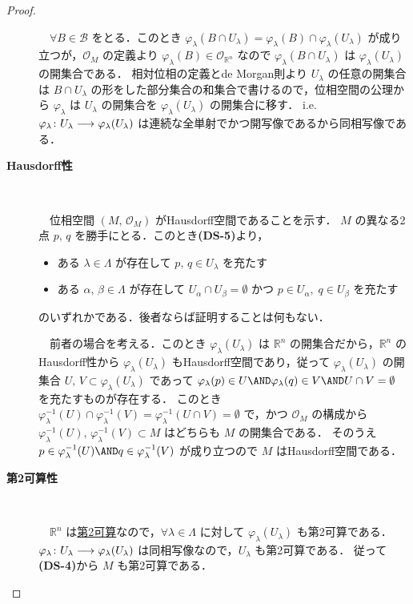 \documentclass[TQFT_main]{subfiles}
\begin{document}
\begin{proof}
\begin{description}
		　$\forall B \in \mathscr{B}$ をとる．このとき $\varphi_\lambda(B \cap U_\lambda) = \varphi_\lambda(B) \cap \varphi_\lambda(U_\lambda)$ が成り立つが，$\mathscr{O}_M$ の定義より $\varphi_\lambda(B) \in \mathscr{O}_{\mathbb{R}^n}$ なので $\varphi_\lambda(B \cap U_\lambda)$ は $\varphi_\lambda(U_\lambda)$ の開集合である．
		相対位相の定義とde Morgan則より $U_\lambda$ の任意の開集合は $B \cap U_\lambda$ の形をした部分集合の和集合で書けるので，位相空間の公理から $\varphi_\lambda$ は $U_\lambda$ の開集合を $\varphi_\lambda(U_\lambda)$ の開集合に移す．
		i.e. $\varphi_\lambda \colon U_\lambda \longrightarrow \varphi_\lambda(U_\lambda)$ は連続な全単射でかつ開写像であるから同相写像である．

		\item[\textbf{Hausdorff性}]　
		
		　位相空間 $(M,\, \mathscr{O}_M)$ がHausdorff空間であることを示す．
		$M$ の異なる2点 $p,\, q$ を勝手にとる．このとき\textsf{\textbf{(DS-5)}}より，
		\begin{itemize}
			\item ある $\lambda \in \Lambda$ が存在して $p,\, q \in U_\lambda$ を充たす
			\item ある $\alpha,\, \beta \in \Lambda$ が存在して $U_\alpha \cap U_\beta = \emptyset$ かつ $p \in U_\alpha,\; q \in U_\beta$ を充たす
		\end{itemize}
		のいずれかである．後者ならば証明することは何もない．

		　前者の場合を考える．このとき $\varphi_\lambda(U_\lambda)$ は $\mathbb{R}^n$ の開集合だから，$\mathbb{R}^n$ のHausdorff性から $\varphi_\lambda(U_\lambda)$ もHausdorff空間であり，従って $\varphi_\lambda(U_\lambda)$ の開集合 $U,\, V \subset \varphi_\lambda(U_\lambda)$ であって $\varphi_\lambda(p) \in U \AND \varphi_\lambda(q) \in V \AND U \cap V = \emptyset$ を充たすものが存在する．
		このとき $\varphi_\lambda^{-1}(U) \cap \varphi_\lambda^{-1}(V) = \varphi^{-1}_\lambda(U\cap V) = \emptyset$ で，かつ $\mathscr{O}_M$ の構成から $\varphi_\lambda^{-1}(U),\, \varphi_\lambda^{-1}(V) \subset M$ はどちらも $M$ の開集合である．
		そのうえ $p \in \varphi_\lambda^{-1}(U) \AND q \in \varphi_\lambda^{-1}(V)$ が成り立つので $M$ はHausdorff空間である．

		\item[\textbf{第2可算性}]　
		
		　$\mathbb{R}^n$ は\hyperref[def:second-countable]{第2可算}なので，$\forall \lambda \in \Lambda$ に対して $\varphi_\lambda(U_\lambda)$ も第2可算である．$\varphi_\lambda \colon U_\lambda \longrightarrow \varphi_\lambda (U_\lambda)$ は同相写像なので，$U_\lambda$ も第2可算である．
		従って\textsf{\textbf{(DS-4)}}から $M$ も第2可算である．
	\end{description}
	

\end{proof}
\end{document}
